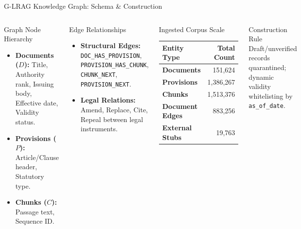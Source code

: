 \begin{frame}{G-LRAG Knowledge Graph: Schema \& Construction}
\small
\begin{columns}[T]
    \begin{block}{Graph Node Hierarchy}
    \scriptsize
    \begin{itemize}
      \item \textbf{Documents ($D$):} Title, Authority rank, Issuing body, Effective date, Validity status.
      \item \textbf{Provisions ($P$):} Article/Clause header, Statutory type.
      \item \textbf{Chunks ($C$):} Passage text, Sequence ID.
    \end{itemize}
    \end{block}

    \begin{block}{Edge Relationships}
    \scriptsize
    \begin{itemize}
      \item \textbf{Structural Edges:} \texttt{DOC\_HAS\_PROVISION}, \texttt{PROVISION\_HAS\_CHUNK}, \texttt{CHUNK\_NEXT}, \texttt{PROVISION\_NEXT}.
      \item \textbf{Legal Relations:} Amend, Replace, Cite, Repeal between legal instruments.
    \end{itemize}
    \end{block}

    \begin{block}{Ingested Corpus Scale}
    \scriptsize
    \centering
    \begin{tabular}{lr}
    \toprule
    \textbf{Entity Type} & \textbf{Total Count} \\
    \midrule
    \textbf{Documents} & 151,624 \\
    \textbf{Provisions} & 1,386,267 \\
    \textbf{Chunks} & 1,513,376 \\
    \textbf{Document Edges} & 883,256 \\
    \textbf{External Stubs} & 19,763 \\
    \bottomrule
    \end{tabular}
    \end{block}

    \begin{alertblock}{Construction Rule}
    \scriptsize
    Draft/unverified records quarantined; dynamic validity whitelisting by \texttt{as\_of\_date}.
    \end{alertblock}
\end{columns}
\end{frame}


